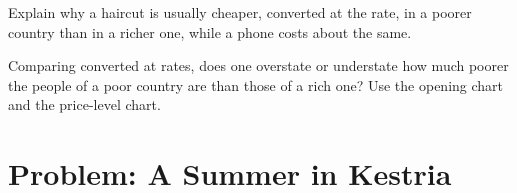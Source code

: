 \begin{exercise}[$\star\star\star$]\label{exo:g9:exchange-rates-and-purchasing-power:11}
Explain why a haircut is usually cheaper, converted at the  rate, in a poorer country than in a
richer one, while a phone costs about the same.
\end{exercise}

\begin{exercise}[$\star\star\star$]\label{exo:g9:exchange-rates-and-purchasing-power:12}
Comparing  converted at  rates, does one overstate or understate how much poorer
the people of a poor country are than those of a rich one? Use the opening chart and the price-level
chart.
\end{exercise}

\section{Problem: A Summer in Kestria}

